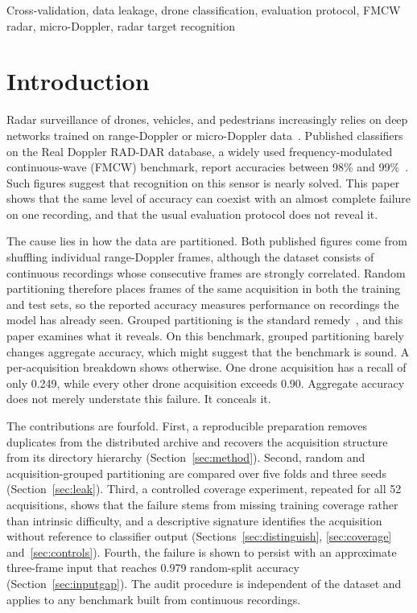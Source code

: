 \documentclass{ICIC2026}
\begin{document}
\begin{IEEEkeywords}
Cross-validation, data leakage, drone classification, evaluation protocol, FMCW radar, micro-Doppler, radar target recognition
\end{IEEEkeywords}

\section{Introduction}

Radar surveillance of drones, vehicles, and pedestrians increasingly relies on deep networks trained on range-Doppler or micro-Doppler data~\cite{ahmad2024,liaquat2025imm,mustafa2026}. Published classifiers on the Real Doppler RAD-DAR database, a widely used frequency-modulated continuous-wave (FMCW) benchmark, report accuracies between 98\% and 99\%~\cite{roldan2020,zhang2025}. Such figures suggest that recognition on this sensor is nearly solved. This paper shows that the same level of accuracy can coexist with an almost complete failure on one recording, and that the usual evaluation protocol does not reveal it.

The cause lies in how the data are partitioned. Both published figures come from shuffling individual range-Doppler frames, although the dataset consists of continuous recordings whose consecutive frames are strongly correlated. Random partitioning therefore places frames of the same acquisition in both the training and test sets, so the reported accuracy measures performance on recordings the model has already seen. Grouped partitioning is the standard remedy~\cite{kapoor2023,buchman2022}, and this paper examines what it reveals. On this benchmark, grouped partitioning barely changes aggregate accuracy, which might suggest that the benchmark is sound. A per-acquisition breakdown shows otherwise. One drone acquisition has a recall of only 0.249, while every other drone acquisition exceeds 0.90. Aggregate accuracy does not merely understate this failure. It conceals it.

The contributions are fourfold. First, a reproducible preparation removes duplicates from the distributed archive and recovers the acquisition structure from its directory hierarchy (Section~\ref{sec:method}). Second, random and acquisition-grouped partitioning are compared over five folds and three seeds (Section~\ref{sec:leak}). Third, a controlled coverage experiment, repeated for all 52 acquisitions, shows that the failure stems from missing training coverage rather than intrinsic difficulty, and a descriptive signature identifies the acquisition without reference to classifier output (Sections~\ref{sec:distinguish}, \ref{sec:coverage} and~\ref{sec:controls}). Fourth, the failure is shown to persist with an approximate three-frame input that reaches 0.979 random-split accuracy (Section~\ref{sec:inputgap}). The audit procedure is independent of the dataset and applies to any benchmark built from continuous recordings.
\end{document}
